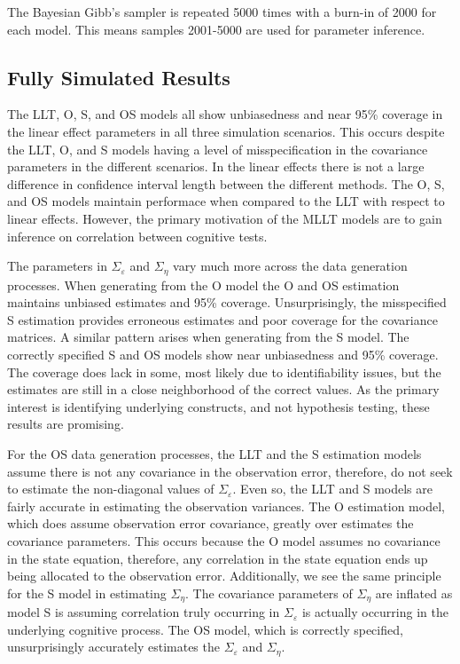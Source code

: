 \documentclass[
]{article}
\begin{document}
The Bayesian Gibb's sampler is repeated 5000 times with a burn-in of 2000 for each model. This means samples 2001-5000 are used for parameter inference.

\hypertarget{fully-simulated-results}{%
\subsection{Fully Simulated Results}\label{fully-simulated-results}}

The LLT, O, S, and OS models all show unbiasedness and near 95\% coverage in the linear effect parameters in all three simulation scenarios. This occurs despite the LLT, O, and S models having a level of misspecification in the covariance parameters in the different scenarios. In the linear effects there is not a large difference in confidence interval length between the different methods. The O, S, and OS models maintain performace when compared to the LLT with respect to linear effects. However, the primary motivation of the MLLT models are to gain inference on correlation between cognitive tests.

The parameters in \(\Sigma_\varepsilon\) and \(\Sigma_\eta\) vary much more across the data generation processes. When generating from the O model the O and OS estimation maintains unbiased estimates and 95\% coverage. Unsurprisingly, the misspecified S estimation provides erroneous estimates and poor coverage for the covariance matrices. A similar pattern arises when generating from the S model. The correctly specified S and OS models show near unbiasedness and 95\% coverage. The coverage does lack in some, most likely due to identifiability issues, but the estimates are still in a close neighborhood of the correct values. As the primary interest is identifying underlying constructs, and not hypothesis testing, these results are promising.

For the OS data generation processes, the LLT and the S estimation models assume there is not any covariance in the observation error, therefore, do not seek to estimate the non-diagonal values of \(\Sigma_\varepsilon\). Even so, the LLT and S models are fairly accurate in estimating the observation variances. The O estimation model, which does assume observation error covariance, greatly over estimates the covariance parameters. This occurs because the O model assumes no covariance in the state equation, therefore, any correlation in the state equation ends up being allocated to the observation error. Additionally, we see the same principle for the S model in estimating \(\Sigma_\eta\). The covariance parameters of \(\Sigma_\eta\) are inflated as model S is assuming correlation truly occurring in \(\Sigma_\varepsilon\) is actually occurring in the underlying cognitive process. The OS model, which is correctly specified, unsurprisingly accurately estimates the \(\Sigma_\varepsilon\) and \(\Sigma_\eta\).
\end{document}
